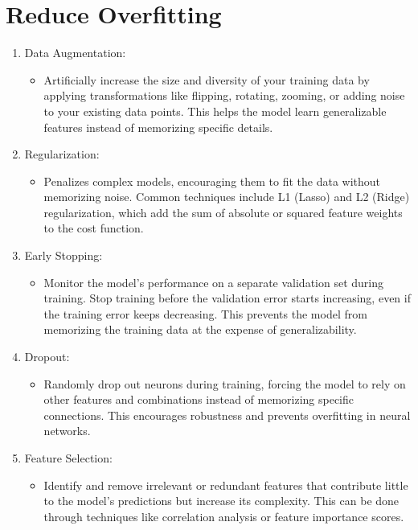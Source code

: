 \section{Reduce Overfitting}
    \begin{enumerate}
        \item Data Augmentation:
            \begin{itemize}
                \item Artificially increase the size and diversity of your training data by applying transformations like flipping, rotating, zooming, or adding noise to your existing data points. This helps the model learn generalizable features instead of memorizing specific details.
            \end{itemize}
        
        \item Regularization:
            \begin{itemize}
                \item Penalizes complex models, encouraging them to fit the data without memorizing noise. Common techniques include L1 (Lasso) and L2 (Ridge) regularization, which add the sum of absolute or squared feature weights to the cost function.
            \end{itemize}
        
        \item Early Stopping:
            \begin{itemize}
                \item Monitor the model's performance on a separate validation set during training. Stop training before the validation error starts increasing, even if the training error keeps decreasing. This prevents the model from memorizing the training data at the expense of generalizability.
            \end{itemize}

        \item Dropout:
            \begin{itemize}
                \item Randomly drop out neurons during training, forcing the model to rely on other features and combinations instead of memorizing specific connections. This encourages robustness and prevents overfitting in neural networks.
            \end{itemize}
        
        \item Feature Selection:
            \begin{itemize}
                \item Identify and remove irrelevant or redundant features that contribute little to the model's predictions but increase its complexity. This can be done through techniques like correlation analysis or feature importance scores.
            \end{itemize}


\end{enumerate}

